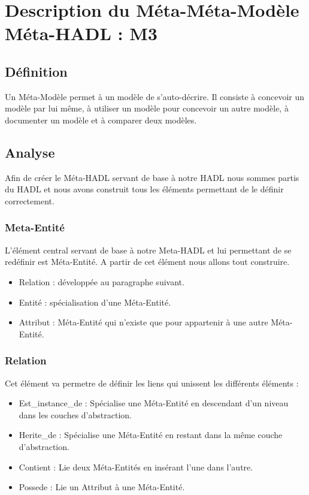 ﻿\chapter{Description du Méta-Méta-Modèle Méta-HADL : M3}

	\section{Définition}
		
		Un Méta-Modèle permet à un modèle de s'auto-décrire. Il consiste à concevoir un modèle par lui même, à utiliser un modèle pour concevoir un autre modèle, à documenter un modèle et à comparer deux modèles.
		
	\section{Analyse}
		Afin de créer le Méta-HADL servant de base à notre HADL nous sommes partis du
		HADL et nous avons construit tous les éléments permettant de le définir
		correctement.
	
		\subsection{Meta-Entité}
			L'élément central servant de base à notre Meta-HADL et lui permettant de se redéfinir est Méta-Entité. A partir de cet élément nous allons tout construire.
			
			\begin{itemize}
				\item Relation : développée au paragraphe suivant.
				\item Entité : spécialisation d'une Méta-Entité.
				\item Attribut : Méta-Entité qui n'existe que pour appartenir à une autre
				Méta-Entité.
			\end{itemize}
		
		\subsection{Relation}
			Cet élément va permetre de définir les liens qui unissent les différents éléments :
				
			\begin{itemize}
				\item Est\_instance\_de : Spécialise une Méta-Entité en descendant d'un
				niveau dans les couches d'abstraction.
				\item Herite\_de : Spécialise une Méta-Entité en restant dans la même couche
				d'abstraction.
				\item Contient : Lie deux Méta-Entités en insérant l'une dans l'autre.
				\item Possede : Lie un Attribut à une Méta-Entité.
			\end{itemize}
			
